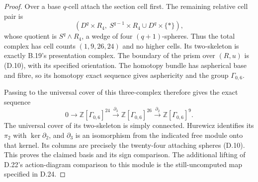 \begin{proof}
Over a base $q$-cell attach the section cell first.
The remaining relative cell pair is
\[
 (D^q\times R_4,\ S^{q-1}\times R_4\cup D^q\times\{*\}),
\]
whose quotient is $S^q\wedge R_4$, a wedge of four
$(q+1)$-spheres.  Thus the total complex has cell counts
$(1,9,26,24)$ and no higher cells.  Its two-skeleton
is exactly B.19's presentation complex.  The boundary
of the prism over $(R,u)$ is (D.10), with its specified
orientation.  The homotopy bundle has aspherical base
and fibre, so its homotopy exact sequence gives
asphericity and the group $\Gamma_{0,6}$.

Passing to the universal cover of this three-complex
therefore gives the exact sequence
\[
 0\longrightarrow\mathbb Z[\Gamma_{0,6}]^{24}
  \xrightarrow{\partial_3}\mathbb Z[\Gamma_{0,6}]^{26}
  \xrightarrow{\partial_2}\mathbb Z[\Gamma_{0,6}]^9.
\]
The universal cover of its two-skeleton is simply
connected.  Hurewicz identifies its $\pi_2$ with
$\ker\partial_2$, and $\partial_3$ is an isomorphism
from the indicated free module onto that kernel.
Its columns are precisely the twenty-four attaching
spheres (D.10).  This proves the claimed basis and
its sign comparison.  The additional lifting of
D.22's action-diagram comparison to this module is
the still-uncomputed map specified in D.24.
\end{proof}
